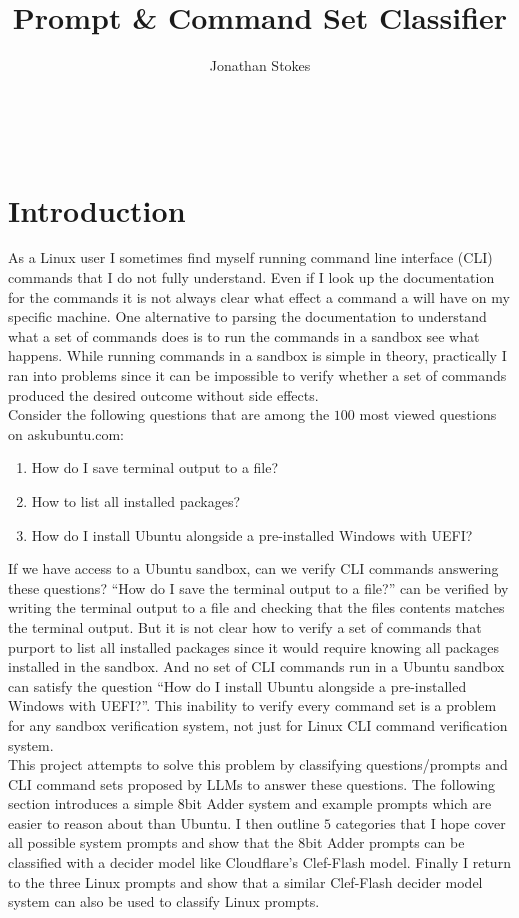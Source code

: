 \documentclass[12pt,a4paper]{article}
\title{Prompt \& Command Set Classifier}
\author{Jonathan Stokes}
\begin{document}
\maketitle

\hrulefill\\

\section{Introduction}

As a Linux user I sometimes find myself running command line interface (CLI) commands that I do not fully understand. Even if I look up the documentation for the commands it is not always clear what
effect a command a will have on my specific machine. One alternative to parsing the documentation to understand what a set of commands does is to run the commands in a sandbox see what happens. 
While running commands in a sandbox is simple in theory, practically I ran into problems since it can be impossible to verify whether a set of commands produced the desired outcome without side effects.\\

Consider the following questions that are among the $100$ most viewed questions on askubuntu.com:
\begin{enumerate}
\item How do I save terminal output to a file?
\item How to list all installed packages?
\item How do I install Ubuntu alongside a pre-installed Windows with UEFI?
\end{enumerate}
If we have access to a Ubuntu sandbox, can we verify CLI commands answering these questions? ``How do I save the terminal output to a file?'' can be verified by writing
the terminal output to a file and checking that the files contents matches the terminal output. But it is not clear how to verify a set of commands that purport to list all installed packages 
since it would require knowing all packages installed in the sandbox. And no set of CLI commands run in a Ubuntu sandbox can satisfy the question
``How do I install Ubuntu alongside a pre-installed Windows with UEFI?''. This inability to verify every command set is a problem for any sandbox verification system, not just for Linux CLI 
command verification system.\\

This project attempts to solve this problem by classifying questions/prompts and CLI command sets proposed by LLMs to answer these questions. 
The following section introduces a simple 8bit Adder system and example prompts which are easier to reason about than Ubuntu. 
I then outline $5$ categories that I hope cover all possible system prompts and show that the 8bit Adder prompts can be classified with a decider model like
Cloudflare's Clef-Flash model. Finally I return to the three Linux prompts and show that a similar Clef-Flash decider model system can also be used to classify Linux prompts.
\end{document}
